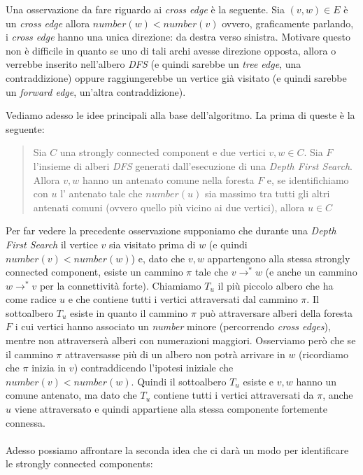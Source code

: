 Una osservazione da fare riguardo ai \emph{cross edge} \`e la
seguente. Sia $(v, w) \in E$ \`e un \emph{cross edge} allora
$number(w) < number(v)$ ovvero, graficamente parlando, i \emph{cross
  edge} hanno una unica direzione: da destra verso sinistra. Motivare
questo non \`e difficile in quanto se uno di tali archi avesse
direzione opposta, allora o verrebbe inserito nell'albero \emph{DFS}
(e quindi sarebbe un \emph{tree edge}, una contraddizione) oppure
raggiungerebbe un vertice gi\`a visitato (e quindi sarebbe un
\emph{forward edge}, un'altra contraddizione).

Vediamo adesso le idee principali alla base dell'algoritmo. La prima
di queste \`e la seguente:
\begin{quotation}
  Sia $C$ una strongly connected component e due vertici $v, w \in
  C$. Sia $F$ l'insieme di alberi \emph{DFS} generati dall'esecuzione
  di una \emph{Depth First Search}. Allora $v, w$ hanno un antenato
  comune nella foresta $F$ e, se identifichiamo con $u$ l' antenato
  tale che $number(u)$ sia massimo tra tutti gli altri antenati comuni
  (ovvero quello pi\`u vicino ai due vertici), allora $u \in C$
\end{quotation}
Per far vedere la precedente osservazione supponiamo che durante una
\emph{Depth First Search} il vertice $v$ sia visitato prima di $w$ (e
quindi $number(v) < number(w)$) e, dato che $v,w$ appartengono alla
stessa strongly connected component, esiste un cammino $\pi$ tale che
$v \rightarrow^{*} w$ (e anche un cammino $w \rightarrow^{*} v$ per la
connettivit\`a forte). Chiamiamo $T_{u}$ il pi\`u piccolo albero che
ha come radice $u$ e che contiene tutti i vertici attraversati dal
cammino $\pi$. Il sottoalbero $T_{u}$ esiste in quanto il cammino
$\pi$ pu\`o attraversare alberi della foresta $F$ i cui vertici hanno
associato un \emph{number} minore (percorrendo \emph{cross edges}),
mentre non attraverser\`a alberi con numerazioni maggiori. Osserviamo
per\`o che se il cammino $\pi$ attraversasse pi\`u di un albero non
potr\`a arrivare in $w$ (ricordiamo che $\pi$ inizia in $v$)
contraddicendo l'ipotesi iniziale che $number(v) < number(w)$. Quindi
il sottoalbero $T_{u}$ esiste e $v,w$ hanno un comune antenato, ma
dato che $T_{u}$ contiene tutti i vertici attraversati da $\pi$, anche
$u$ viene attraversato e quindi appartiene alla stessa componente
fortemente connessa.
\\\\
Adesso possiamo affrontare la seconda idea che ci dar\`a un modo per
identificare le strongly connected components:
